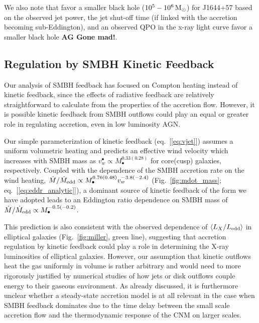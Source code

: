 \documentclass[usenatbib,fleqn]{mn2e}
\begin{document}
 We also note that \citet{Tchekhovskoy+2014} favor a smaller black hole
($10^5-10^6 \,{\rm M_\odot}$) for J1644+57 based on the observed jet power, the jet
shut-off time (if linked with the accretion becoming sub-Eddington), and an
observed QPO in the x-ray light curve favor a smaller black hole {\bf
  AG Gone mad!}. 


\subsection{Regulation by SMBH Kinetic Feedback}
\label{sec:kinetic}

Our analysis of SMBH feedback has focused on Compton heating instead
of kinetic feedback, since the effects of radiative feedback are
relatively straightforward to calculate from the properties of the
accretion flow.  However, it is possible kinetic feedback from SMBH
outflows could play an equal or greater role in regulating accretion,
even in low luminosity AGN.

Our simple parameterization of kinetic feedback (eq.~[\ref{eq:vjet}])
assumes a uniform volumetric heating and predicts an effective wind
velocity which increases with SMBH mass as $v_{w}^{\bullet} \propto
M_{\bullet}^{0.33(0.28)}$ for core(cusp) galaxies, respectively.
Coupled with the dependence of the SMBH accretion rate on the wind
heating, $\dot{M}/\dot{M}_{\rm edd} \propto
M_{\bullet}^{0.76(0.48)}v_{w}^{-3.8(-2.4)}$ (Fig.~\ref{fig:mdot_mass};
eq.~[\ref{eq:eddr_analytic}]), a dominant source of kinetic feedback
of the form we have adopted leads to an Eddington ratio dependence on
SMBH mass of $\dot{M}/\dot{M}_{\rm edd} \propto
M_{\bullet}^{-0.5(-0.2)}$.

This prediction is also consistent with the observed dependence of
$\langle L_{X}/L_{\rm edd} \rangle$ in elliptical galaxies
(Fig.~\ref{fig:miller}, green line), suggesting that accretion
regulation by kinetic feedback could play a role in determining the
X-ray luminosities of elliptical galaxies.  However, our assumption
that kinetic outflows heat the gas uniformly in volume is rather
arbitrary and would need to more rigorously justified by numerical
studies of how jets or disk outflows couple energy to their gaseous
environment.  As already discussed, it is furthermore unclear whether
a steady-state accretion model is at all relevant in the case when
SMBH feedback dominates due to the time delay between the small scale
accretion flow and the thermodynamic response of the CNM on larger
scales.
\end{document}
